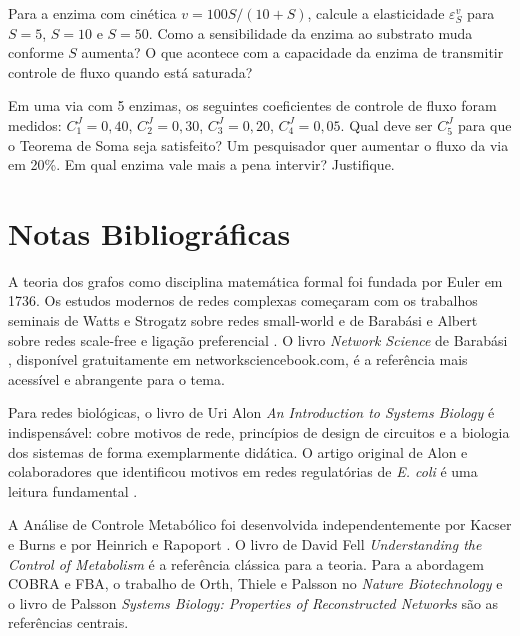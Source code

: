 \begin{exercicio}[MCA]
Para a enzima com cinética $v = 100 S / (10 + S)$, calcule a elasticidade
$\varepsilon_S^v$ para $S = 5$, $S = 10$ e $S = 50$. Como a sensibilidade da enzima
ao substrato muda conforme $S$ aumenta? O que acontece com a capacidade da enzima de
transmitir controle de fluxo quando está saturada?
\end{exercicio}

\begin{exercicio}[MCA]
Em uma via com 5 enzimas, os seguintes coeficientes de controle de fluxo foram medidos:
$C_1^J = 0{,}40$, $C_2^J = 0{,}30$, $C_3^J = 0{,}20$, $C_4^J = 0{,}05$. Qual deve ser
$C_5^J$ para que o Teorema de Soma seja satisfeito? Um pesquisador quer aumentar o fluxo
da via em 20\%. Em qual enzima vale mais a pena intervir? Justifique.
\end{exercicio}

\section{Notas Bibliográficas}

A teoria dos grafos como disciplina matemática formal foi fundada por Euler em 1736.
Os estudos modernos de redes complexas começaram com os trabalhos seminais de Watts e
Strogatz sobre redes small-world \cite{watts1998} e de Barabási e Albert sobre redes
scale-free e ligação preferencial \cite{barabasi1999}. O livro \textit{Network Science}
de Barabási \cite{barabasi2016}, disponível gratuitamente em networksciencebook.com,
é a referência mais acessível e abrangente para o tema.

Para redes biológicas, o livro de Uri Alon \textit{An Introduction to Systems Biology}
\cite{alon2019} é indispensável: cobre motivos de rede, princípios de design de circuitos
e a biologia dos sistemas de forma exemplarmente didática. O artigo original de Alon e
colaboradores que identificou motivos em redes regulatórias de \textit{E. coli} é uma
leitura fundamental \cite{milo2002}.

A Análise de Controle Metabólico foi desenvolvida independentemente por Kacser e Burns
\cite{kacser1973} e por Heinrich e Rapoport \cite{heinrich1974}. O livro de David Fell
\textit{Understanding the Control of Metabolism} \cite{fell1997} é a referência clássica
para a teoria. Para a abordagem COBRA e FBA, o trabalho de Orth, Thiele e Palsson
\cite{orth2010} no \textit{Nature Biotechnology} e o livro de Palsson \textit{Systems
Biology: Properties of Reconstructed Networks} \cite{palsson2015} são as referências
centrais.

